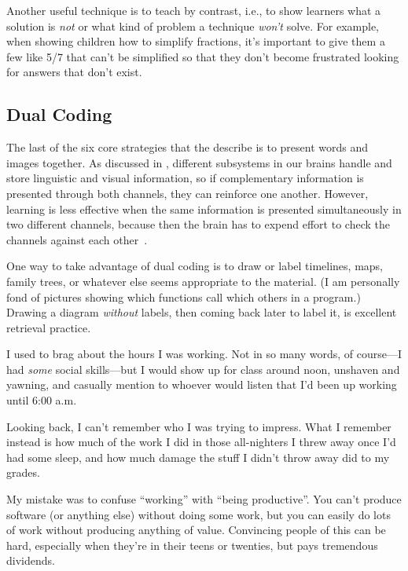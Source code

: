 Another useful technique is to teach by contrast,
i.e.,
to show learners what a solution is \emph{not}
or what kind of problem a technique \emph{won't} solve.
For example,
when showing children how to simplify fractions,
it's important to give them a few like 5/7 that can't be simplified
so that they don't become frustrated looking for answers that don't exist.

\subsection*{Dual Coding}

The last of the six core strategies
that the  describe
is to present words and images together.
As discussed in ,
different subsystems in our brains handle and store linguistic and visual information,
so if complementary information is presented through both channels,
they can reinforce one another.
However,
learning is less effective when the same information is presented simultaneously in two different channels,
because then the brain has to expend effort to check the channels against each other~\cite{Maye2003}.

One way to take advantage of dual coding is to draw or label timelines,
maps, family trees,
or whatever else seems appropriate to the material.
(I am personally fond of pictures showing which functions call which others in a program.)
Drawing a diagram \emph{without} labels,
then coming back later to label it,
is excellent retrieval practice.


I used to brag about the hours I was working.
Not in so many words,
of course---I had \emph{some} social skills---but
I would show up for class around noon,
unshaven and yawning,
and casually mention to whoever would listen
that I'd been up working until 6:00 a.m.

Looking back,
I can't remember who I was trying to impress.
What I remember instead is
how much of the work I did in those all-nighters I threw away once I'd had some sleep,
and how much damage the stuff I didn't throw away did to my grades.

My mistake was to confuse ``working'' with ``being productive''.
You can't produce software (or anything else) without doing some work,
but you can easily do lots of work without producing anything of value.
Convincing people of this can be hard,
especially when they're in their teens or twenties,
but pays tremendous dividends.

